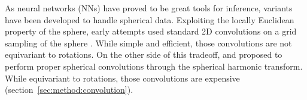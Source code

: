 \documentclass{article} %
\newcommand{\secref}[1]{section~\ref{sec:#1}}
\begin{document}


As neural networks (NNs) have proved to be great tools for inference, variants have been developed to handle spherical data.
Exploiting the locally Euclidean property of the sphere, early attempts used standard 2D convolutions on a grid sampling of the sphere \citep{boomsma2017sphericalcnn, su2017sphericalcnn, coors2018sphericalcnn}.
While simple and efficient, those convolutions are not equivariant to rotations.
On the other side of this tradeoff, \citet{cohen2018sphericalcnn} and \citet{esteves2018sphericalcnn} proposed to perform proper spherical convolutions through the spherical harmonic transform.
While equivariant to rotations, those convolutions are expensive (\secref{method:convolution}).

\end{document}
